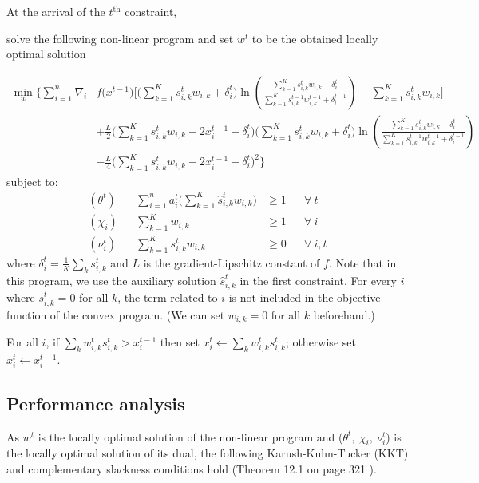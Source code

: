 At the arrival of the $t^{\text{th}}$ constraint,
\begin{compactenum}
\item solve the following non-linear program and set $w^t$ to be the obtained locally optimal solution

\begin{align*}
\min_{w} \biggl\{\sum_{i=1}^{n}
\nabla_{i} & f\bigl(x^{t-1} \bigr) \biggl[  \biggl(\sum_{k=1}^{K} s_{i,k}^{t} w_{i,k}  + \delta_{i}^{t} \biggr)
\ln \left(\frac{ \sum_{k=1}^{K} s_{i,k}^{t} w_{i,k}  + \delta_{i}^{t} }{\sum_{k=1}^{K} s_{i,k}^{t-1} w_{i,k}^{t-1} + \delta_{i}^{t-1}}\right)
- \sum_{k=1}^{K}  s_{i,k}^{t} w_{i,k} \biggr] \\
%
&+ \frac{L}{2}\biggl( \sum_{k=1}^{K} s_{i,k}^{t} w_{i,k}  - 2x_{i}^{t-1} - \delta_{i}^{t} \biggr) \biggl(\sum_{k=1}^{K} s_{i,k}^{t} w_{i,k} + \delta_{i}^{t} \biggr)
\ln \left(\frac{ \sum_{k=1}^{K} s_{i,k}^{t} w_{i,k}  + \delta_{i}^{t} }{\sum_{k=1}^{K} s_{i,k}^{t-1} w_{i,k}^{t-1}  + \delta_{i}^{t-1}}\right) \\
%
&- \frac{L}{4} \biggl( \sum_{k=1}^{K} s_{i,k}^{t} w_{i,k}  - 2x_{i}^{t-1} - \delta_{i}^{t} \biggr)^{2}
\biggr\}
\end{align*}
%
\noindent subject to:
%
\begin{align*}
    (\theta^{t})  && \sum_{i=1}^{n} a_{i}^{t} \biggl( \sum_{k=1}^{K}  \hat{s}_{i,k}^{t} w_{i,k} \biggr) &\geq 1 && \forall\ t\\
    (\chi_{i}) && \sum_{k=1}^{K}  w_{i,k} &\geq 1 && \forall\ i\\
    (\nu_{i}^{t}) && \sum_{k=1}^{K} s_{i,k}^{t} w_{i,k} &\geq 0 && \forall\ i,t
\end{align*}
%
where $\delta_{i}^{t} = \frac{1}{K} \sum_{k} s_{i,k}^{t}$ and $L$ is the gradient-Lipschitz constant of $f$.
Note that in this program, we use the auxiliary solution $\hat{s}_{i,k}^{t}$ in the first constraint. For every $i$ where $s_{i,k}^{t} = 0$ for all $k$, the term related to $i$ is not included in the objective function of the convex program.
(We can set $w_{i,k} = 0$ for all $k$ beforehand.)
%
\item For all $i$, if $\sum_{k} w_{i,k}^{t} s_{i,k}^{t} > x_{i}^{t-1}$ then set $x_{i}^{t} \gets \sum_{k} w_{i,k}^{t} s_{i,k}^{t}$;
otherwise set $x_{i}^{t} \gets x_{i}^{t-1}$.
\end{compactenum}

\subsection{Performance analysis}
As $w^{t}$ is the locally optimal solution of the non-linear program and ($\theta^t,\ \chi_{i},\ \nu_{i}^{t}$) is the locally optimal solution of its dual, the following Karush-Kuhn-Tucker (KKT) and complementary slackness conditions hold (Theorem 12.1 on page 321 \cite{NocedalWright:FirstOrderOptimalityConditions}).

